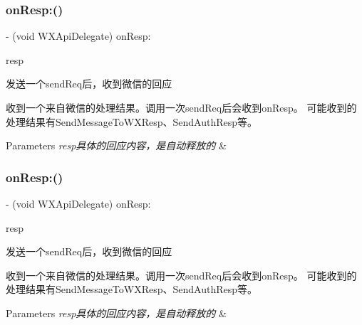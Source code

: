 \subsubsection{\texorpdfstring{on\+Resp\+:()}{onResp:()}\hspace{0.1cm}{\footnotesize\ttfamily [1/3]}}
{\footnotesize\ttfamily -\/ (void W\+X\+Api\+Delegate) on\+Resp\+: \begin{DoxyParamCaption}\item[{(\mbox{\hyperlink{interface_base_resp}{Base\+Resp}} $\ast$)}]{resp }\end{DoxyParamCaption}\hspace{0.3cm}{\ttfamily [optional]}}



发送一个send\+Req后，收到微信的回应 

收到一个来自微信的处理结果。调用一次send\+Req后会收到on\+Resp。 可能收到的处理结果有\+Send\+Message\+To\+W\+X\+Resp、\+Send\+Auth\+Resp等。 
\begin{DoxyParams}{Parameters}
{\em resp具体的回应内容，是自动释放的} & \\
\hline
\end{DoxyParams}
\mbox{\label{protocol_w_x_api_delegate_01-p_a241d3c0bbfa2c223235df0f1b118b687}} 
\subsubsection{\texorpdfstring{on\+Resp\+:()}{onResp:()}\hspace{0.1cm}{\footnotesize\ttfamily [2/3]}}
{\footnotesize\ttfamily -\/ (void W\+X\+Api\+Delegate) on\+Resp\+: \begin{DoxyParamCaption}\item[{(\mbox{\hyperlink{interface_base_resp}{Base\+Resp}} $\ast$)}]{resp }\end{DoxyParamCaption}\hspace{0.3cm}{\ttfamily [optional]}}



发送一个send\+Req后，收到微信的回应 

收到一个来自微信的处理结果。调用一次send\+Req后会收到on\+Resp。 可能收到的处理结果有\+Send\+Message\+To\+W\+X\+Resp、\+Send\+Auth\+Resp等。 
\begin{DoxyParams}{Parameters}
{\em resp具体的回应内容，是自动释放的} & \\
\hline
\end{DoxyParams}
\mbox{\label{protocol_w_x_api_delegate_01-p_a241d3c0bbfa2c223235df0f1b118b687}} 
